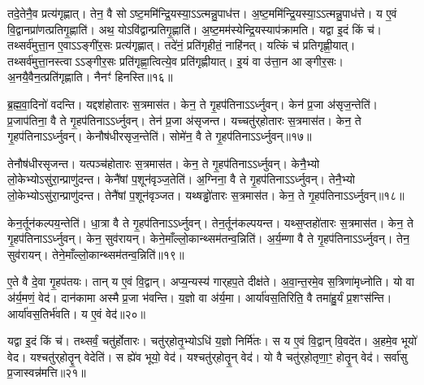 तदे॒तेनै॒व प्रत्य॑गृह्णात्।
तेन॒ वै सो\-ऽष्ट॒ममि॑न्द्रि॒य\-स्या॒\-ऽऽत्मन्नु॒पा\-ध॑त्त।
अ॒ष्ट॒ममि॑न्द्रि॒य\-स्या॒\-ऽऽत्मन्नु॒पा\-ध॑त्ते।
य ए॒वं वि॒द्वानप्रा॑णत्प्रति\-गृ॒ह्णाति॑।
अथ॒ योऽवि॑द्वान्प्रति\-गृ॒ह्णाति॑।
अ॒ष्ट॒म\-म॑स्येन्द्रि॒य\-स्याप॑\-क्रामति।
यद्वा इ॒दं किं च॑।
तथ्सर्व॑मुत्ता॒न ए॒वा\-ऽऽङ्गी॑र॒सः प्रत्य॑\-गृह्णात्।
तदे॑नं॒ प्रति॑\-गृहीतं॒ नाहि॑नत्।
यत्किं च॑ प्रति\-गृह्णी॒यात्।
तथ्सर्व॑मुत्ता॒नस्त्वा\-ऽऽङ्गीर॒सः प्रति॑\-गृह्णा॒त्वित्ये॒व प्रति॑\-गृह्णीयात्।
इ॒यं वा उ॑त्ता॒न आङ्गीर॒सः।
अ॒नयै॒वैन॒त्प्रति॑\-गृह्णाति।
नैनꣳ॑ हिनस्ति॥१६॥

ब्र॒ह्म॒वा॒दिनो॑ वदन्ति।
यद्दश॑होतारः स॒त्रमास॑त।
केन॒ ते गृ॒हप॑तिना\-ऽऽर्ध्नुवन्।
केन॑ प्र॒जा अ॑सृज॒न्तेति॑।
प्र॒जाप॑तिना॒ वै ते गृ॒हप॑तिना\-ऽऽर्ध्नुवन्।
तेन॑ प्र॒जा अ॑सृजन्त।
यच्चतु॑र्‌\mbox{}होतारः स॒त्रमास॑त।
केन॒ ते गृ॒हप॑तिना\-ऽऽर्ध्नुवन्।
केनौष॑धीरसृज॒न्तेति॑।
सोमे॑न॒ वै ते गृ॒हप॑तिना\-ऽऽर्ध्नुवन्॥१७॥

तेनौष॑धीरसृजन्त।
यत्पञ्च॑होतारः स॒त्रमास॑त।
केन॒ ते गृ॒हप॑तिना\-ऽऽर्ध्नुवन्।
केनै॒भ्यो लो॒केभ्यो\-ऽसु॑रा॒न्प्राणु॑दन्त।
केनै॑षां प॒शून॑वृञ्ज॒तेति॑।
अ॒ग्निना॒ वै ते गृ॒हप॑तिना\-ऽऽर्ध्नुवन्।
तेनै॒भ्यो लो॒केभ्यो\-ऽसु॑रा॒न्प्राणु॑दन्त।
तेनै॑षां प॒शून॑वृञ्जत।
यथ्षड्ढो॑तारः स॒त्रमास॑त।
केन॒ ते गृ॒हप॑तिना\-ऽऽर्ध्नुवन्॥१८॥

केन॒र्तून॑कल्पय॒न्तेति॑।
धा॒त्रा वै ते गृ॒हप॑तिना\-ऽऽर्ध्नुवन्।
तेन॒र्तून॑कल्पयन्त।
यथ्स॒प्तहो॑तारः स॒त्रमास॑त।
केन॒ ते गृ॒हप॑तिना\-ऽऽर्ध्नुवन्।
केन॒ सुव॑रायन्।
केने॒माँल्लो॒कान्थ्सम॑\-तन्व॒न्निति॑।
अ॒र्य॒म्णा वै ते गृ॒हप॑तिना\-ऽऽर्ध्नुवन्।
तेन॒ सुव॑रायन्।
तेने॒माँल्लो॒कान्थ्सम॑तन्व॒न्निति॑॥१९॥

ए॒ते वै दे॒वा गृ॒हप॑तयः।
तान् य ए॒वं वि॒द्वान्।
अप्य॒न्यस्य॑ गार्‌\mbox{}हप॒ते दीक्ष॑ते।
अ॒वा॒न्त॒रमे॒व स॒त्रिणा॑मृध्नोति।
यो वा अ॑र्य॒मणं॒ वेद॑।
दान॑कामा अस्मै प्र॒जा भ॑वन्ति।
य॒ज्ञो वा अ॑र्य॒मा।
आर्या॑वस॒तिरिति॒ वै तमा॑हु॒र्यं प्र॒शꣳस॑न्ति।
आर्या॑वस॒तिर्भ॑वति।
य ए॒वं वेद॑॥२०॥

यद्वा इ॒दं किं च॑।
तथ्सर्वं॒ चतु॑र्\mbox{}होतारः।
चतु॑र्‌\mbox{}होतृ॒भ्योऽधि॑ य॒ज्ञो निर्मि॑तः।
स य ए॒वं वि॒द्वान्‌ वि॒वदे॑त।
अ॒हमे॒व भूयो॑ वेद।
यश्चतु॑र्‌\mbox{}होतॄ॒न् वेदेति॑।
स ह्ये॑व भूयो॒ वेद॑।
यश्चतु॑र्‌\mbox{}होतॄ॒न् वेद॑।
यो वै चतु॑र्‌\mbox{}होतृणा॒ꣳ॒ होतॄ॒न् वेद॑।
सर्वा॑सु प्र॒जास्वन्न॑मत्ति॥२१॥

